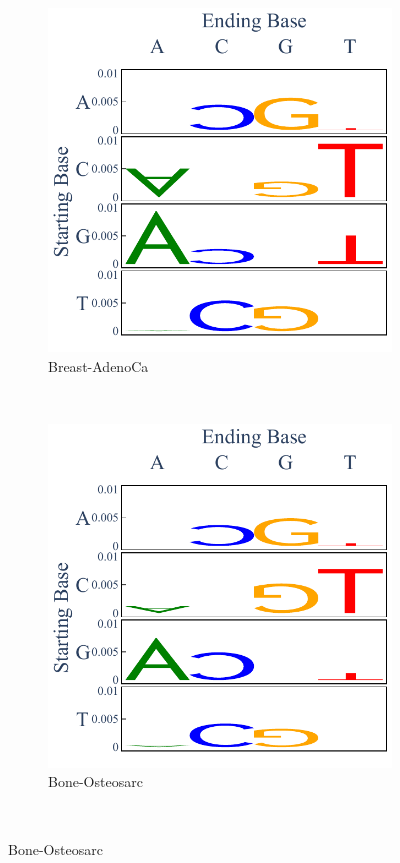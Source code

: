 \begin{figure}[ht!]
    \begin{subfigure}{.5\textwidth}
    \centering
    \includegraphics[scale=0.45]{graphics/spectra_Breast-AdenoCa.pdf}
    \caption{Breast-AdenoCa}
    \end{subfigure}
    ~
    \begin{subfigure}{.5\textwidth}
    \centering
    \includegraphics[scale=0.45]{graphics/spectra_Bone-Osteosarc.pdf}
    \caption{Bone-Osteosarc}
    \end{subfigure} \\
    

\end{figure}
